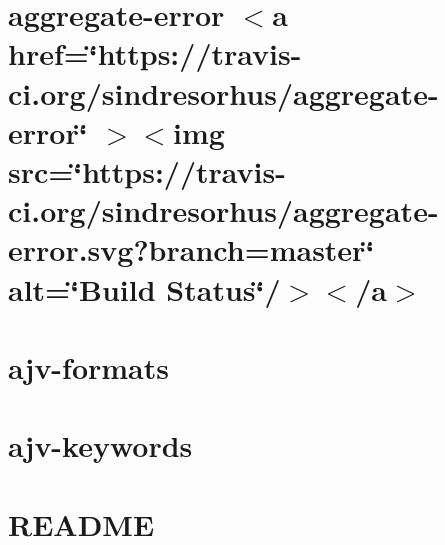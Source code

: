 \documentclass[twoside]{book}
\newcommand{\+}{\discretionary{\mbox{\scriptsize$\hookleftarrow$}}{}{}}
\begin{document}
\chapter{aggregate-\/error \texorpdfstring{$<$}{<}a href=\char`\"{}https\+://travis-\/ci.\+org/sindresorhus/aggregate-\/error\char`\"{} \texorpdfstring{$>$}{>}\texorpdfstring{$<$}{<}img src=\char`\"{}https\+://travis-\/ci.\+org/sindresorhus/aggregate-\/error.\+svg?branch=master\char`\"{} alt=\char`\"{}\+Build Status\char`\"{}/\texorpdfstring{$>$}{>}\texorpdfstring{$<$}{<}/a\texorpdfstring{$>$}{>}}
\label{md__c___users_vaishnavi_jadhav__desktop__developer_code_mean_stack_example_client_node_modules_aggregate_error_readme}

\chapter{ajv-\/formats}
\label{md__c___users_vaishnavi_jadhav__desktop__developer_code_mean_stack_example_client_node_modules_ajv_formats__r_e_a_d_m_e}

\chapter{ajv-\/keywords}
\label{md__c___users_vaishnavi_jadhav__desktop__developer_code_mean_stack_example_client_node_modules_ajv_keywords__r_e_a_d_m_e}

\chapter{README}
\label{md__c___users_vaishnavi_jadhav__desktop__developer_code_mean_stack_example_client_node_modules_ajv__r_e_a_d_m_e}

\end{document}
